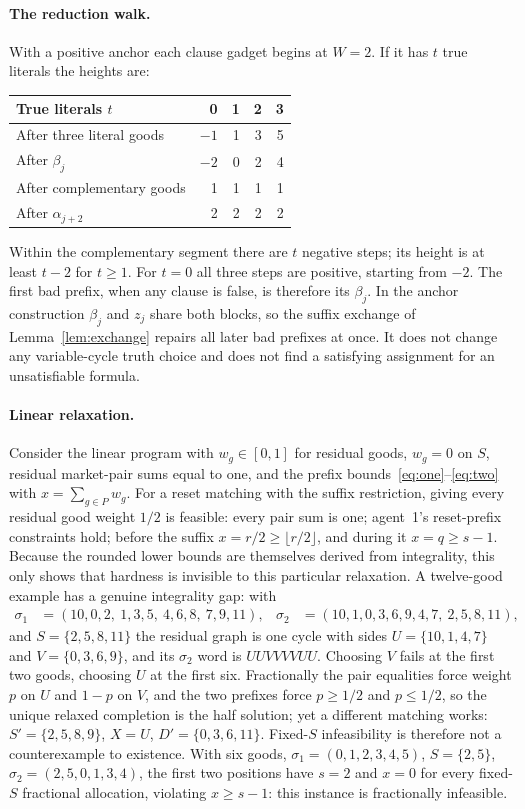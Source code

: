 \documentclass[11pt]{article}
\theoremstyle{definition}
\begin{document}
\paragraph{The reduction walk.}
With a positive anchor each clause gadget begins at $W=2$. If it has $t$ true literals the heights are:
\begin{center}\small
\begin{tabular}{@{}lrrrr@{}}
\toprule
True literals $t$ & 0 & 1 & 2 & 3\\ \midrule
After three literal goods & $-1$ & 1 & 3 & 5\\
After $\beta_j$ & $-2$ & 0 & 2 & 4\\
After complementary goods & 1 & 1 & 1 & 1\\
After $\alpha_{j+2}$ & 2 & 2 & 2 & 2\\
\bottomrule
\end{tabular}
\end{center}
Within the complementary segment there are $t$ negative steps; its height is at least $t-2$ for $t\ge1$. For $t=0$ all three steps are positive, starting from $-2$. The first bad prefix, when any clause is false, is therefore its $\beta_j$. In the anchor construction $\beta_j$ and $z_j$ share both blocks, so the suffix exchange of Lemma~\ref{lem:exchange} repairs all later bad prefixes at once. It does not change any variable-cycle truth choice and does not find a satisfying assignment for an unsatisfiable formula.

\paragraph{Linear relaxation.}
Consider the linear program with $w_g\in[0,1]$ for residual goods, $w_g=0$ on $S$, residual market-pair sums equal to one, and the prefix bounds~\eqref{eq:one}--\eqref{eq:two} with $x=\sum_{g\in P}w_g$. For a reset matching with the suffix restriction, giving every residual good weight $1/2$ is feasible: every pair sum is one; agent~1's reset-prefix constraints hold; before the suffix $x=r/2\ge\lfloor r/2\rfloor$, and during it $x=q\ge s-1$. Because the rounded lower bounds are themselves derived from integrality, this only shows that hardness is invisible to this particular relaxation. A twelve-good example has a genuine integrality gap: with
\begin{align*}
 \sigma_1&=(10,0,2,\ 1,3,5,\ 4,6,8,\ 7,9,11), &
 \sigma_2&=(10,1,0,3,6,9,4,7,\ 2,5,8,11),
\end{align*}
and $S=\{2,5,8,11\}$ the residual graph is one cycle with sides $U=\{10,1,4,7\}$ and $V=\{0,3,6,9\}$, and its $\sigma_2$ word is $UUVVVVUU$. Choosing $V$ fails at the first two goods, choosing $U$ at the first six. Fractionally the pair equalities force weight $p$ on $U$ and $1-p$ on $V$, and the two prefixes force $p\ge1/2$ and $p\le1/2$, so the unique relaxed completion is the half solution; yet a different matching works: $S'=\{2,5,8,9\}$, $X=U$, $D'=\{0,3,6,11\}$. Fixed-$S$ infeasibility is therefore not a counterexample to existence. With six goods, $\sigma_1=(0,1,2,3,4,5)$, $S=\{2,5\}$, $\sigma_2=(2,5,0,1,3,4)$, the first two positions have $s=2$ and $x=0$ for every fixed-$S$ fractional allocation, violating $x\ge s-1$: this instance is fractionally infeasible.
\end{document}

